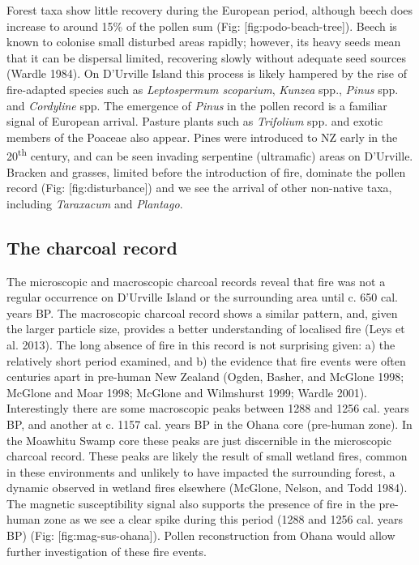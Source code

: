 Forest taxa show little recovery during the European period, although
beech does increase to around 15\% of the pollen sum (Fig:
{[}fig:podo-beach-tree{]}). Beech is known to colonise small disturbed
areas rapidly; however, its heavy seeds mean that it can be dispersal
limited, recovering slowly without adequate seed sources (Wardle 1984).
On D'Urville Island this process is likely hampered by the rise of
fire-adapted species such as \emph{Leptospermum scoparium},
\emph{Kunzea} spp., \emph{Pinus} spp. and \emph{Cordyline} spp. The
emergence of \emph{Pinus} in the pollen record is a familiar signal of
European arrival. Pasture plants such as \emph{Trifolium} spp. and
exotic members of the Poaceae also appear. Pines were introduced to NZ
early in the 20\textsuperscript{th} century, and can be seen invading
serpentine (ultramafic) areas on D'Urville. Bracken and grasses, limited
before the introduction of fire, dominate the pollen record (Fig:
{[}fig:disturbance{]}) and we see the arrival of other non-native taxa,
including \emph{Taraxacum} and \emph{Plantago}.

\subsection{The charcoal record}\label{the-charcoal-record}

The microscopic and macroscopic charcoal records reveal that fire was
not a regular occurrence on D'Urville Island or the surrounding area
until c. 650 cal. years BP. The macroscopic charcoal record shows a
similar pattern, and, given the larger particle size, provides a better
understanding of localised fire (Leys et al. 2013). The long absence of
fire in this record is not surprising given: a) the relatively short
period examined, and b) the evidence that fire events were often
centuries apart in pre-human New Zealand (Ogden, Basher, and McGlone
1998; McGlone and Moar 1998; McGlone and Wilmshurst 1999; Wardle 2001).
Interestingly there are some macroscopic peaks between 1288 and 1256
cal. years BP, and another at c. 1157 cal. years BP in the Ohana core
(pre-human zone). In the Moawhitu Swamp core these peaks are just
discernible in the microscopic charcoal record. These peaks are likely
the result of small wetland fires, common in these environments and
unlikely to have impacted the surrounding forest, a dynamic observed in
wetland fires elsewhere (McGlone, Nelson, and Todd 1984). The magnetic
susceptibility signal also supports the presence of fire in the
pre-human zone as we see a clear spike during this period (1288 and 1256
cal. years BP) (Fig: {[}fig:mag-sus-ohana{]}). Pollen reconstruction
from Ohana would allow further investigation of these fire events.

